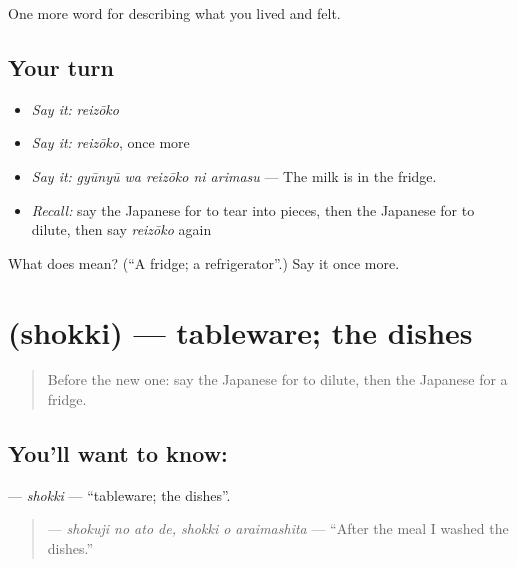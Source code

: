 \begin{grammarlens}[title={What you've built}]
One more word for describing what you lived and felt.
\end{grammarlens}

\subsection*{Your turn}
\begin{itemize}
\raggedright
  \item \emph{Say it:} \emph{reizōko}
  \item \emph{Say it:} \emph{reizōko}, once more
  \item \emph{Say it:} \emph{gyūnyū wa reizōko ni arimasu} — The milk is in the fridge.
  \item \emph{Recall:} say the Japanese for to tear into pieces, then the Japanese for to dilute, then say \emph{reizōko} again
\end{itemize}

\begin{tcolorbox}[breakable,colback=teal!4,colframe=teal!35!black,title={Before you move on}]
What does  mean? (\textquotedblleft{}A fridge; a refrigerator\textquotedblright{}.) Say it once more.
\end{tcolorbox}
\section[\texorpdfstring{\ja{しょっき} (shokki)}{しょっき (shokki)}]{ (shokki) — tableware; the dishes}

\label{lesson:JA-C475-shokki}



\begin{quote}
Before the new one: say the Japanese for to dilute, then the Japanese for a fridge.
\end{quote}

\subsection*{You'll want to know: }
\textbf{} — \emph{shokki} — \textquotedblleft{}tableware; the dishes\textquotedblright{}.

\begin{quote}
\textbf{  } — \emph{shokuji no ato de, shokki o araimashita} — \textquotedblleft{}After the meal I washed the dishes.\textquotedblright{}
\end{quote}

